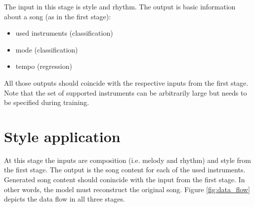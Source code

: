 \documentclass[en]{pracamgr}
\begin{document}
The input in this stage is style and rhythm.
The output is basic information about a song (as in the first stage):
\begin{itemize}
    \item used instruments (classification)
    \item mode (classification)
    \item tempo (regression)
\end{itemize}

All those outputs should coincide with the respective inputs from the first stage.
Note that the set of supported instruments can be arbitrarily large but needs to be specified during training.

\section{Style application}

At this stage the inputs are composition (i.e. melody and rhythm) and style from the first stage.
The output is the song content for each of the used instruments.
Generated song content should conincide with the input from the first stage.
In other words, the model must reconstruct the original song.
Figure \ref{fig:data_flow} depicts the data flow in all three stages.
\end{document}
